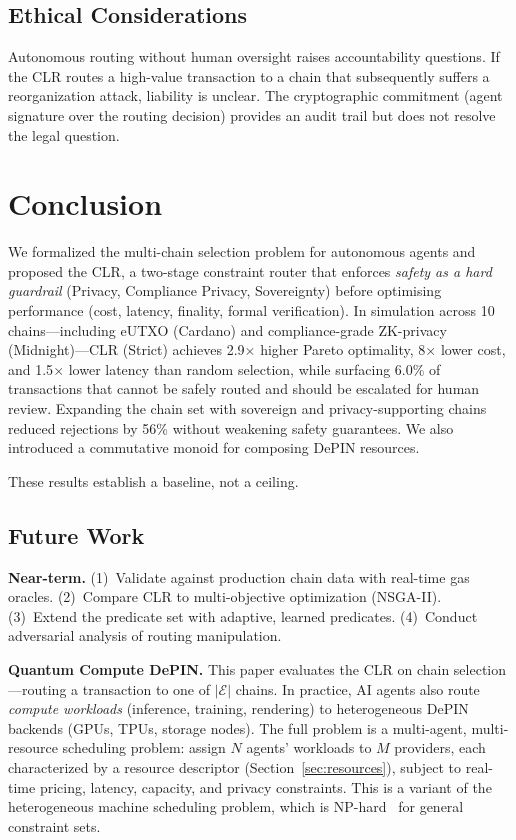 \documentclass[conference, 10pt, twocolumn]{IEEEtran}
\begin{document}
\subsection{Ethical Considerations}

Autonomous routing without human oversight raises accountability
questions.  If the CLR routes a high-value transaction to a chain
that subsequently suffers a reorganization attack, liability is
unclear.  The cryptographic commitment (agent signature over
the routing decision) provides an audit trail but does not resolve
the legal question.

\section{Conclusion}
\label{sec:conclusion}

We formalized the multi-chain selection problem for autonomous agents
and proposed the CLR, a two-stage constraint router that enforces
\emph{safety as a hard guardrail} (Privacy, Compliance Privacy,
Sovereignty) before optimising performance (cost, latency, finality,
formal verification).  In simulation across 10 chains---including
eUTXO (Cardano) and compliance-grade ZK-privacy (Midnight)---CLR
(Strict) achieves 2.9$\times$ higher Pareto optimality, 8$\times$
lower cost, and 1.5$\times$ lower latency than random selection, while
surfacing 6.0\% of transactions that cannot be safely routed and
should be escalated for human review.  Expanding the chain set with
sovereign and privacy-supporting chains reduced rejections by 56\%
without weakening safety guarantees.  We also introduced a commutative
monoid for composing DePIN resources.

These results establish a baseline, not a ceiling.

\subsection{Future Work}

\textbf{Near-term.} (1)~Validate against production chain data with
real-time gas oracles. (2)~Compare CLR to multi-objective optimization
(NSGA-II). (3)~Extend the predicate set with adaptive, learned
predicates. (4)~Conduct adversarial analysis of routing manipulation.

\textbf{Quantum Compute DePIN.}  This paper evaluates the CLR on
chain selection---routing a transaction to one of $|\mathcal{E}|$
chains.  In practice, AI agents also route \emph{compute workloads}
(inference, training, rendering) to heterogeneous DePIN backends
(GPUs, TPUs, storage nodes).  The full problem is a multi-agent,
multi-resource scheduling problem: assign $N$ agents' workloads to
$M$ providers, each characterized by a resource descriptor
(Section~\ref{sec:resources}), subject to real-time pricing, latency,
capacity, and privacy constraints.  This is a variant of the
heterogeneous machine scheduling problem, which is
NP-hard~\cite{garey1979computers} for general constraint sets.
\end{document}

